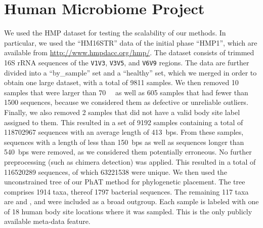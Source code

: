 
\section{Human Microbiome Project}
\label{supp:sec:DetailsEmpiricalDatasets:sub:HMP}

We used the \acf{HMP} dataset \cite{Huttenhower2012,Methe2012} for testing the scalability of our methods.
In particular, we used the ``HM16STR'' data of the initial phase ``HMP1'',
which are available from \url{http://www.hmpdacc.org/hmp/}.
The dataset consists of trimmed 16S rRNA sequences of the \texttt{V1V3}, \texttt{V3V5}, and \texttt{V6V9} regions.
The data are further divided into a ``by\_sample'' set and a ``healthy'' set,
which we merged in order to obtain one large dataset, with a total of \num{9 811} samples.
We then removed \num{10} samples that were larger than \SI{70}{\mega\byte}
as well as \num{605} samples that had fewer than \num{1 500} sequences,
because we considered them as defective or unreliable outliers.
Finally, we also removed \num{2} samples that did not have a valid body site label assigned to them.
This resulted in a set of \num{9192} samples
containing a total of \num{118 702 967} sequences with an average length of \SI{413}{bps}.
From these samples, sequences with a length of less than \SI{150}{bps}
as well as sequences longer than \SI{540}{bps} were removed,
as we considered them potentially erroneous.
No further preprocessing (such as chimera detection) was applied.
This resulted in a total of \num{116 520 289} sequences, of which \num{63 221 538} were unique.
We then used the unconstrained  tree of our \ac{PhAT} method \cite{Czech2018} for phylogenetic placement.
The tree comprises \num{1 914} taxa, thereof \num{1 797} bacterial sequences.
The remaining \num{117} taxa are  and ,
and were included as a broad outgroup.
Each sample is labeled with one of \num{18} human body site locations where it was sampled.
This is the only publicly available meta-data feature.



